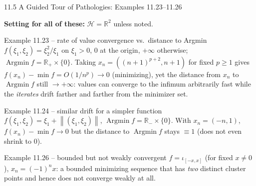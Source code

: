 \documentclass[aspectratio=169,10pt]{beamer}
\newcommand{\mHH}{\mathcal H}
\newcommand{\norm}[1]{\left\|#1\right\|}
\newcommand{\R}{\mathbb{R}}
\newcommand{\Rp}{\mathbb{R}_{+}}
\newcommand{\Argmin}{\operatorname{Argmin}}
\begin{document}
\begin{frame}{11.5 A Guided Tour of Pathologies: Examples 11.23--11.26}

  \textbf{Setting for all of these:} $\mHH=\R^2$ unless noted.

  \begin{block}{Example 11.23 -- rate of value convergence vs.\ distance to Argmin}
    $f(\xi_1,\xi_2)=\xi_2^2/\xi_1$ on $\xi_1>0$, $0$ at the origin,
    $+\infty$ otherwise; $\Argmin f=\Rp\times\{0\}$. Taking
    $x_n=((n+1)^{p+2},n+1)$ for fixed $p\ge1$ gives
    $f(x_n)-\min f=O(1/n^p)\to0$ (minimizing), yet the distance from
    $x_n$ to $\Argmin f$ still $\to+\infty$: values can converge to
    the infimum arbitrarily fast while the \emph{iterates} drift
    farther and farther from the minimizer set.
  \end{block}

  \begin{block}{Example 11.24 -- similar drift for a simpler function}
    $f(\xi_1,\xi_2)=\xi_1+\norm{(\xi_1,\xi_2)}$, $\Argmin f=\R_-\times\{0\}$.
    With $x_n=(-n,1)$, $f(x_n)-\min f\to0$ but the distance to
    $\Argmin f$ stays $\equiv1$ (does not even shrink to $0$).
  \end{block}

  \begin{block}{Example 11.26 -- bounded but not weakly convergent}
    $f=\iota_{[-x,x]}$ (for fixed $x\neq0$), $x_n=(-1)^nx$: a bounded
    minimizing sequence that has \emph{two} distinct cluster points
    and hence does not converge weakly at all.
  \end{block}

\end{frame}
\end{document}
